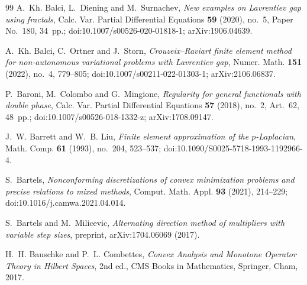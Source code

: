 \documentclass[11pt]{amsart}
\theoremstyle{definition}
\theoremstyle{remark}
\numberwithin{equation}{section}
\begin{document}
\begin{thebibliography}{99}
A.~Kh. Balci, L.~Diening and M.~Surnachev, \emph{New examples on Lavrentiev gap using fractals}, Calc. Var. Partial Differential Equations \textbf{59} (2020), no.~5, Paper No.~180, 34~pp.; doi:10.1007/s00526-020-01818-1; arXiv:1906.04639.

A.~Kh. Balci, C.~Ortner and J.~Storn, \emph{Crouzeix--Raviart finite element method for non-autonomous variational problems with Lavrentiev gap}, Numer. Math. \textbf{151} (2022), no.~4, 779--805; doi:10.1007/s00211-022-01303-1; arXiv:2106.06837.

P.~Baroni, M.~Colombo and G.~Mingione, \emph{Regularity for general functionals with double phase}, Calc. Var. Partial Differential Equations \textbf{57} (2018), no.~2, Art.~62, 48~pp.; doi:10.1007/s00526-018-1332-z; arXiv:1708.09147.

J.~W. Barrett and W.~B. Liu, \emph{Finite element approximation of the $p$-Laplacian}, Math. Comp. \textbf{61} (1993), no.~204, 523--537; doi:10.1090/S0025-5718-1993-1192966-4.

S.~Bartels, \emph{Nonconforming discretizations of convex minimization problems and precise relations to mixed methods}, Comput. Math. Appl. \textbf{93} (2021), 214--229; doi:10.1016/j.camwa.2021.04.014.

S.~Bartels and M.~Milicevic, \emph{Alternating direction method of multipliers with variable step sizes}, preprint, arXiv:1704.06069 (2017).

H.~H. Bauschke and P.~L. Combettes, \emph{Convex Analysis and Monotone Operator Theory in Hilbert Spaces}, 2nd ed., CMS Books in Mathematics, Springer, Cham, 2017.


\end{thebibliography}
\end{document}
